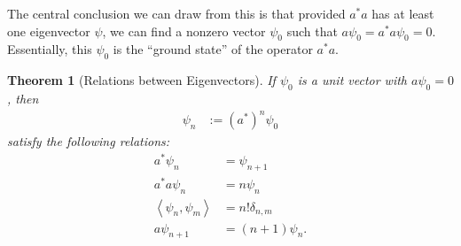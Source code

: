 \documentclass[12pt]{extarticle}
\newcommand{\iprod}[2]{\left\langle #1,#2\right\rangle}
\theoremstyle{plain}
\newtheorem*{theorem}{Theorem}%
\theoremstyle{definition}
\theoremstyle{remark}
\begin{document}
  The central conclusion we can draw from this is that provided $a^{\ast}a$ has at least one eigenvector $\psi$, we can find a nonzero vector $\psi_0$ such that $a\psi_0 = a^{\ast}a\psi_0 = 0$. Essentially, this $\psi_0$ is the ``ground state'' of the operator $a^{\ast}a$.
  \begin{theorem}[Relations between Eigenvectors]
    If $\psi_0$ is a unit vector with $a\psi_0 = 0$, then
    \begin{align*}
      \psi_n &:= \left(a^{\ast}\right)^{n}\psi_0
    \end{align*}
    satisfy the following relations:
    \begin{align*}
      a^{\ast}\psi_n &= \psi_{n+1}\\
      a^{\ast}a\psi_n &= n\psi_n\\
      \iprod{\psi_n}{\psi_m} &= n!\delta_{n,m}\\
      a\psi_{n+1} &= \left(n+1\right)\psi_n.
    \end{align*}
  \end{theorem}
\end{document}
